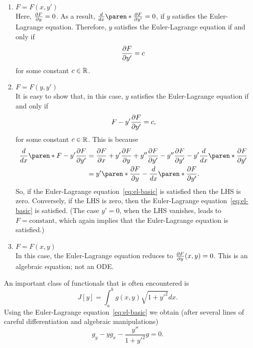 \documentclass[11pt]{penrose}
\begin{document}
\begin{enumerate}
    \item $F = F(x,y')$\\
    Here, $\frac{\partial F}{\partial y} = 0$. As a result, $\frac{d}{dx} \paren*{\frac{\pd F}{\pd y'}} = 0$, if $y$ satisfies the Euler-Lagrange equation. Therefore, $y$ satisfies the Euler-Lagrange equation if and only if
    \begin{equation}
        \frac{\partial F}{\partial y'} = c
        \label{eq:first-integral-y}
    \end{equation}
    for some constant $c \in \mathbb{R}$.

    \item $F = F(y,y')$\\
    It is easy to show that, in this case, $y$ satisfies the Euler-Lagrange equation if and only if
    \begin{equation}
        F - y' \frac{\partial F}{\partial y'} = c,
        \label{eq:first-integral-x}
    \end{equation}
    for some constant $c \in \mathbb{R}$. This is because
    \begin{align}
        \frac{d}{dx} \paren*{ F - y' \frac{\pd F}{\pd y'} }
        &= \frac{\pd F}{\pd x} + y' \frac{\pd F}{\pd y} + y'' \frac{\pd F}{\pd y'} - y'' \frac{\pd F}{\pd y'} - y' \frac{d}{dx} \paren*{\frac{\pd F}{\pd y'}}\\
        &= y' \paren*{ \frac{\pd F}{\pd y} - \frac{d}{dx} \paren*{\frac{\pd F}{\pd y'}} }.
    \end{align}
    So, if the Euler-Lagrange equation~\eqref{eq:el-basic} is satisfied then the LHS is zero. Conversely, if the LHS is zero, then the Euler-Lagrange equation~\eqref{eq:el-basic} is satisfied. (The case $y' = 0$, when the LHS vanishes, leads to $F = \text{constant}$, which again implies that the Euler-Lagrange equation is satisfied.)

    \item $F = F(x,y)$\\
    In this case, the Euler-Lagrange equation reduces to $\frac{\partial F}{\partial y} (x,y) = 0$. This is an algebraic equation; not an ODE.
\end{enumerate}

An important class of functionals that is often encountered is
\begin{equation}
    J[y] = \int_{a}^{b} g(x,y) \sqrt{1 + y'^2} dx.
\end{equation}
Using the Euler-Lagrange equation~\eqref{eq:el-basic} we obtain (after several lines of careful differentiation and algebraic manipulations)
\begin{equation}
    g_y - y g_x - \frac{y''}{1 + y'^2} g = 0.
\end{equation}
\end{document}
